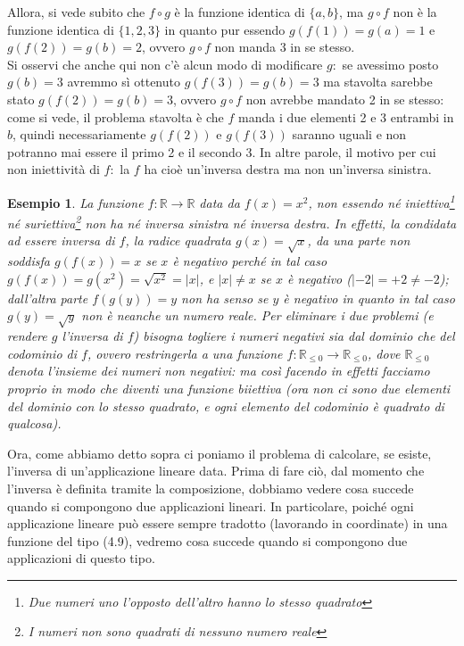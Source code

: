 \documentclass{book}
\newtheorem{esempio}{Esempio}
\begin{document}
Allora, si vede subito che $f\circ g$ è la funzione identica di $\{a,b\}$, ma $g\circ f$ non è la funzione
identica di $\{1,2,3\}$ in quanto pur essendo $g(f(1))=g(a)=1$ e $g(f(2))=g(b)=2$, ovvero $g\circ f$ non manda 3
in se stesso.\\
Si osservi che anche qui non c'è alcun modo di modificare $g:$ se avessimo posto $g(b)=3$
avremmo sì ottenuto $g(f(3))=g(b)=3$ ma stavolta sarebbe stato $g(f(2))=g(b)=3$, ovvero
$g \circ f$ non avrebbe mandato 2 in se stesso: come si vede, il problema stavolta è che $f$
manda i due elementi 2 e 3 entrambi in $b$, quindi necessariamente $g(f(2))$ e $g(f(3))$ saranno
uguali e non potranno mai essere il primo 2 e il secondo 3. In altre parole, il motivo per cui
non iniettività di $f:$ la $f$ ha cioè un'inversa destra ma non un'inversa sinistra.
\begin{esempio}
  La funzione $f:\mathbb{R} \to \mathbb{R}$ data da $f(x)=x^2$, non essendo né
  iniettiva\footnote{Due numeri uno l'opposto dell'altro hanno lo stesso quadrato} né
  suriettiva\footnote{I numeri non sono quadrati di nessuno numero reale} non ha né inversa
  sinistra né inversa destra. In effetti, la condidata ad essere inversa di $f$, la radice
  quadrata $g(x)=\sqrt{x}$, da una parte non soddisfa $g(f(x))=x$ se $x$ è negativo perché in
  tal caso $g(f(x))=g(x^2)=\sqrt{x^2}=|x|$, e $|x|\neq x$ se $x$ è negativo ($|-2|=+2\neq -2$);
  dall'altra parte $f(g(y))=y$ non ha senso se $y$ è negativo in quanto in tal caso
  $g(y)=\sqrt{y}$ non è neanche un numero reale. Per eliminare i due problemi (e rendere $g$
  l'inversa di $f$) bisogna togliere i numeri negativi sia dal dominio che del codominio di $f$,
  ovvero restringerla a una funzione $f:\mathbb{R}_{\leq 0} \to \mathbb{R}_{\leq 0}$, dove
  $\mathbb{R}_{\leq 0}$ denota l'insieme dei numeri non negativi: ma così facendo in effetti
  facciamo proprio in modo che diventi una funzione biiettiva (ora non ci sono due elementi del
  dominio con lo stesso quadrato, e ogni elemento del codominio è quadrato di qualcosa).
\end{esempio}
Ora, come abbiamo detto sopra ci poniamo il problema di calcolare, se esiste, l'inversa di
un'applicazione lineare data. Prima di fare ciò, dal momento che l'inversa è definita tramite la
composizione, dobbiamo vedere cosa succede quando si compongono due applicazioni lineari.
In particolare, poiché ogni applicazione lineare può essere sempre tradotto (lavorando in
coordinate) in una funzione del tipo (4.9), vedremo cosa succede quando si compongono due
applicazioni di questo tipo.\\
\end{document}
